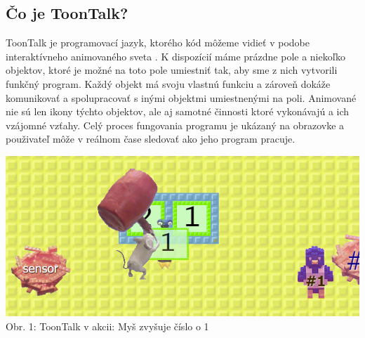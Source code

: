 \documentclass[slovak,a4paper,11pt]{article}
\begin{document}
\subsection{Čo je ToonTalk?}
ToonTalk je programovací jazyk, ktorého kód môžeme vidieť v podobe interaktívneho animovaného sveta \cite{kahn1999computer}. K dispozícií máme prázdne pole a niekoľko objektov, ktoré je možné na toto pole umiestniť tak, aby sme z nich vytvorili funkčný program. Každý objekt má svoju vlastnú funkciu a zároveň dokáže komunikovať a spolupracovať s inými objektmi umiestnenými na poli. Animované nie sú len ikony týchto objektov, ale aj samotné činnosti ktoré vykonávajú a ich vzájomné vzťahy. Celý proces fungovania programu je ukázaný na obrazovke a použivateľ môže v reálnom čase sledovať ako jeho program pracuje. \\
\begin{center}
\includegraphics[scale=0.4]{toontalkmain}
\\ Obr. 1: ToonTalk v akcii: Myš zvyšuje číslo o 1
\end{center}
\end{document}
